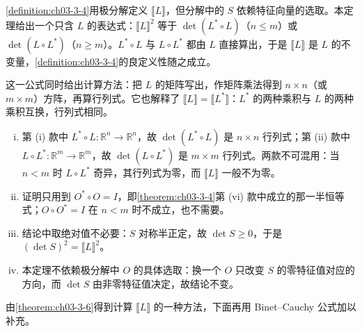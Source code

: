 \documentclass[../../main.tex]{subfiles}%
\begin{document}
\begin{remark}\label{remark:ch03-thm-3-6-动机}
\cref{definition:ch03-3-4}用极分解定义 $\llbracket L\rrbracket$，但分解中的 $S$ 依赖特征向量的选取。本定理给出一个只含 $L$ 的表达式：$\llbracket L\rrbracket^2$ 等于 $\det(L^*\circ L)$（$n\leqslant m$）或 $\det(L\circ L^*)$（$n\geqslant m$）。$L^*\circ L$ 与 $L\circ L^*$ 都由 $L$ 直接算出，于是 $\llbracket L\rrbracket$ 是 $L$ 的不变量，\cref{definition:ch03-3-4}的良定义性随之成立。%

这一公式同时给出计算方法：把 $L$ 的矩阵写出，作矩阵乘法得到 $n\times n$（或 $m\times m$）方阵，再算行列式。它也解释了 $\llbracket L\rrbracket=\llbracket L^*\rrbracket$：$L^*$ 的两种乘积与 $L$ 的两种乘积互换，行列式相同。
\end{remark}

\begin{remark}\label{remark:ch03-thm-3-6-条件}
\begin{enumerate}[(i)]
\item 第 (i) 款中 $L^*\circ L:\mathbb{R}^n\to\mathbb{R}^n$，故 $\det(L^*\circ L)$ 是 $n\times n$ 行列式；第 (ii) 款中 $L\circ L^*:\mathbb{R}^m\to\mathbb{R}^m$，故 $\det(L\circ L^*)$ 是 $m\times m$ 行列式。两款不可混用：当 $n<m$ 时 $L\circ L^*$ 奇异，其行列式为零，而 $\llbracket L\rrbracket$ 一般不为零。
\item 证明只用到 $O^*\circ O=I$，即\cref{theorem:ch03-3-4}第 (vi) 款中成立的那一半恒等式；$O\circ O^*=I$ 在 $n<m$ 时不成立，也不需要。%
\item 结论中取绝对值不必要：$S$ 对称半正定，故 $\det S\geqslant0$，于是 $(\det S)^2=\llbracket L\rrbracket^2$。
\item 本定理不依赖极分解中 $O$ 的具体选取：换一个 $O$ 只改变 $S$ 的零特征值对应的方向，而 $\det S$ 由非零特征值决定，故结论不变。
\end{enumerate}
\end{remark}

由\cref{theorem:ch03-3-6}得到计算 $\llbracket L\rrbracket$ 的一种方法，下面再用 Binet--Cauchy 公式加以补充。%
\end{document}
